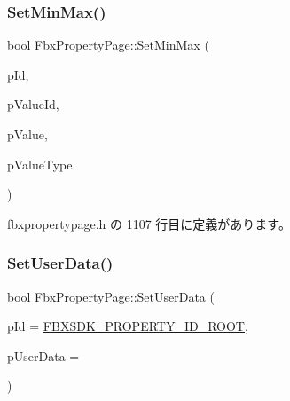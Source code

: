 \mbox{\label{class_fbx_property_page_a806d74ac95a70a176c235368e939c1e2}} 
\subsubsection{\texorpdfstring{Set\+Min\+Max()}{SetMinMax()}}
{\footnotesize\ttfamily bool Fbx\+Property\+Page\+::\+Set\+Min\+Max (\begin{DoxyParamCaption}\item[{\hyperlink{fbxtypes_8h_a088fa96de3b0b3ea69f0f6afef525dfb}{Fbx\+Int}}]{p\+Id,  }\item[{\hyperlink{class_fbx_property_info_a83069f079a29bde133f2e9324de5af43}{Fbx\+Property\+Info\+::\+E\+Value\+Index}}]{p\+Value\+Id,  }\item[{const void $\ast$}]{p\+Value,  }\item[{\hyperlink{fbxpropertytypes_8h_a73913a5ddfb20e57c6f25e9e6784bd92}{E\+Fbx\+Type}}]{p\+Value\+Type }\end{DoxyParamCaption})\hspace{0.3cm}{\ttfamily [inline]}}



 fbxpropertypage.\+h の 1107 行目に定義があります。

\mbox{\label{class_fbx_property_page_a01bb449f90d1ade4b7c120f80dfdafea}} 
\subsubsection{\texorpdfstring{Set\+User\+Data()}{SetUserData()}}
{\footnotesize\ttfamily bool Fbx\+Property\+Page\+::\+Set\+User\+Data (\begin{DoxyParamCaption}\item[{\hyperlink{fbxtypes_8h_a088fa96de3b0b3ea69f0f6afef525dfb}{Fbx\+Int}}]{p\+Id = {\ttfamily \hyperlink{fbxpropertydef_8h_a291bdb6d8428dce8463143fa3aba2c34}{F\+B\+X\+S\+D\+K\+\_\+\+P\+R\+O\+P\+E\+R\+T\+Y\+\_\+\+I\+D\+\_\+\+R\+O\+OT}},  }\item[{const void $\ast$}]{p\+User\+Data = {} }\end{DoxyParamCaption})\hspace{0.3cm}{\ttfamily [inline]}}



